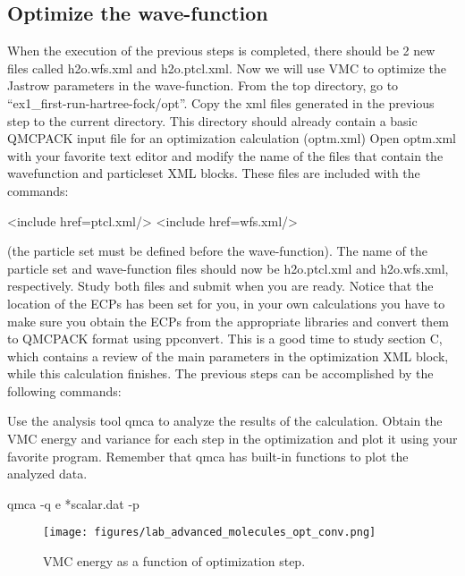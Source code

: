 \subsection{Optimize the wave-function}
When the execution of the previous steps is completed, there should be 2 new
files called h2o.wfs.xml and h2o.ptcl.xml. Now we will use VMC to optimize the 
Jastrow parameters in the wave-function.  From the top directory, go to
``ex1\_first-run-hartree-fock/opt''. Copy the xml files generated in the previous step
to the current directory. This directory should already contain a basic QMCPACK input
file for an optimization calculation (optm.xml) %
Open optm.xml with your favorite text editor and modify the name of the files that contain the
wavefunction and particleset XML blocks. These files are included with the commands:
\begin{shade}
<include href=ptcl.xml/>
<include href=wfs.xml/>
\end{shade}
(the particle set must be
defined before the wave-function). The name of the particle set and wave-function files should now be h2o.ptcl.xml
and h2o.wfs.xml, respectively. Study both files and submit when you are ready. Notice that the
location of the ECPs has been set for you, in your own calculations you have to make
sure you obtain the ECPs from the appropriate libraries and convert them to QMCPACK
format using ppconvert. This is a good time to study section C, which contains a review
of the main parameters in the optimization XML block, while this calculation finishes. The
previous steps can be accomplished by the following commands:

Use the analysis tool qmca to analyze the results of the calculation. Obtain the VMC
energy and variance for each step in the optimization and plot it using your favorite program.
Remember that qmca has built-in functions to plot the analyzed data.
\begin{shade}
qmca -q e *scalar.dat -p
\end{shade}

\begin{figure}
\begin{center}
\texttt{[image: figures/lab\_advanced\_molecules\_opt\_conv.png]}
\end{center}
\caption{VMC energy as a function of optimization step.
\label{fig:lam_opt_conv}
}
\end{figure}

